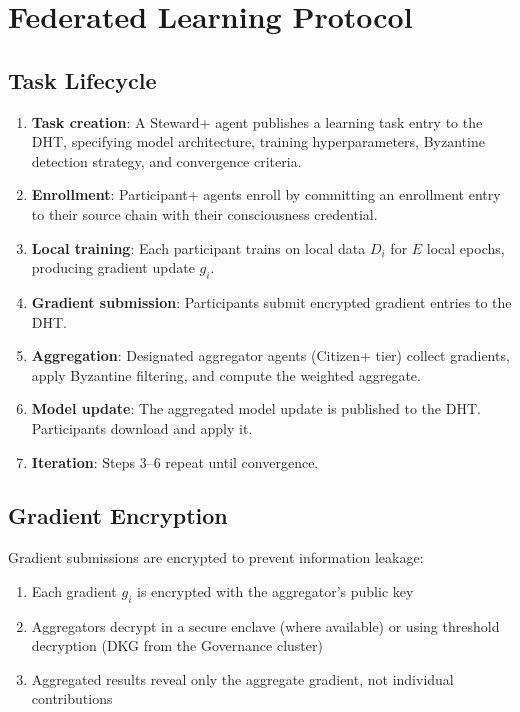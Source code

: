 \documentclass[11pt,twocolumn]{article}
\begin{document}
\section{Federated Learning Protocol}

\subsection{Task Lifecycle}

\begin{enumerate}[nosep]
  \item \textbf{Task creation}: A Steward+ agent publishes a learning task entry
    to the DHT, specifying model architecture, training hyperparameters,
    Byzantine detection strategy, and convergence criteria.
  \item \textbf{Enrollment}: Participant+ agents enroll by committing an
    enrollment entry to their source chain with their consciousness credential.
  \item \textbf{Local training}: Each participant trains on local data $D_i$ for
    $E$ local epochs, producing gradient update $g_i$.
  \item \textbf{Gradient submission}: Participants submit encrypted gradient
    entries to the DHT.
  \item \textbf{Aggregation}: Designated aggregator agents (Citizen+ tier)
    collect gradients, apply Byzantine filtering, and compute the weighted
    aggregate.
  \item \textbf{Model update}: The aggregated model update is published to
    the DHT. Participants download and apply it.
  \item \textbf{Iteration}: Steps 3--6 repeat until convergence.
\end{enumerate}

\subsection{Gradient Encryption}

Gradient submissions are encrypted to prevent information leakage:

\begin{enumerate}[nosep]
  \item Each gradient $g_i$ is encrypted with the aggregator's public key
  \item Aggregators decrypt in a secure enclave (where available) or using
    threshold decryption (DKG from the Governance cluster)
  \item Aggregated results reveal only the aggregate gradient, not individual
    contributions
\end{enumerate}
\end{document}
